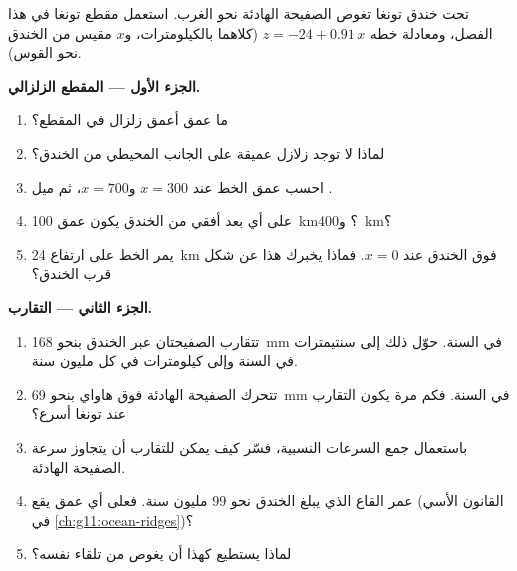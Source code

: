 \begin{problem}
\label{pb:g11:subduction-zones:1}
تحت خندق تونغا تغوص الصفيحة الهادئة نحو الغرب. استعمل مقطع
تونغا في هذا الفصل، ومعادلة خطه $z = -24 + 0.91\,x$ (كلاهما
بالكيلومترات، و$x$ مقيس من الخندق نحو القوس).

\medskip
\noindent\textbf{الجزء الأول --- المقطع الزلزالي.}
\begin{enumerate}
  \item ما عمق أعمق زلزال في المقطع؟
  \item لماذا لا توجد زلازل عميقة على الجانب المحيطي من الخندق؟
  \item احسب عمق الخط عند $x = 300$ و$x = 700$، ثم
        ميل .
  \item على أي بعد أفقي من الخندق يكون عمق 
        \qty{100}{km}؟ و\qty{400}{km}؟
  \item يمر الخط على ارتفاع \qty{24}{km} فوق الخندق عند $x = 0$. فماذا
        يخبرك هذا عن شكل  قرب الخندق؟
\end{enumerate}

\medskip
\noindent\textbf{الجزء الثاني --- التقارب.}
\begin{enumerate}[resume]
  \item تتقارب الصفيحتان عبر الخندق بنحو \qty{168}{mm} في السنة.
        حوّل ذلك إلى سنتيمترات في السنة وإلى كيلومترات في كل مليون سنة.
  \item تتحرك الصفيحة الهادئة فوق هاواي بنحو \qty{69}{mm} في السنة.
        فكم مرة يكون التقارب عند تونغا أسرع؟
  \item باستعمال جمع السرعات النسبية، فسّر كيف يمكن للتقارب أن
        يتجاوز سرعة الصفيحة الهادئة.
  \item عمر القاع الذي يبلغ الخندق نحو 99 مليون سنة. فعلى أي
        عمق يقع (القانون الأسي في \cref{ch:g11:ocean-ridges})؟
  \item لماذا يستطيع  كهذا أن يغوص من تلقاء نفسه؟
\end{enumerate}


\end{problem}

